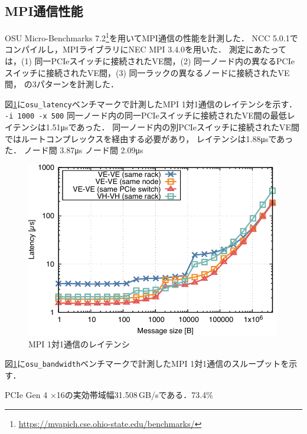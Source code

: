 ﻿\documentclass[submit,techrep,noauthor]{ipsj}
\newcommand{\us}{\si{\micro\second}}
\begin{document}
\subsection{MPI通信性能}\label{sec:mpi}

OSU Micro-Benchmarks
7.2\footnote{\url{https://mvapich.cse.ohio-state.edu/benchmarks/}}を用いてMPI通信の性能を計測した．
NCC 5.0.1でコンパイルし，MPIライブラリにNEC MPI 3.4.0を用いた．
測定にあたっては，(1) 同一PCIeスイッチに接続されたVE間，(2)
同一ノード内の異なるPCIeスイッチに接続されたVE間，(3) 同一ラックの異なるノードに接続されたVE間，
の3パターンを計測した．


図\ref{fig:mpi-lat}に\verb|osu_latency|ベンチマークで計測したMPI 1対1通信のレイテンシを示す．
\verb|-i 1000 -x 500|
同一ノード内の同一PCIeスイッチに接続されたVE間の最低レイテンシは1.51\us であった．
同一ノード内の別PCIeスイッチに接続されたVE間ではルートコンプレックスを経由する必要があり，
レイテンシは1.88\us であった．
ノード間 3.87\us
ノード間 2.09\us

\begin{figure}[tb]
  \centering
  \includegraphics{figs/mpi_latency.pdf}
  \caption{MPI 1対1通信のレイテンシ}\label{fig:mpi-lat}
\end{figure}

図\ref{fig:mpi-lat}に\verb|osu_bandwidth|ベンチマークで計測したMPI 1対1通信のスループットを示す．

PCIe Gen 4 $\times$16の実効帯域幅31.508\,GB/sである．73.4\%
\end{document}
